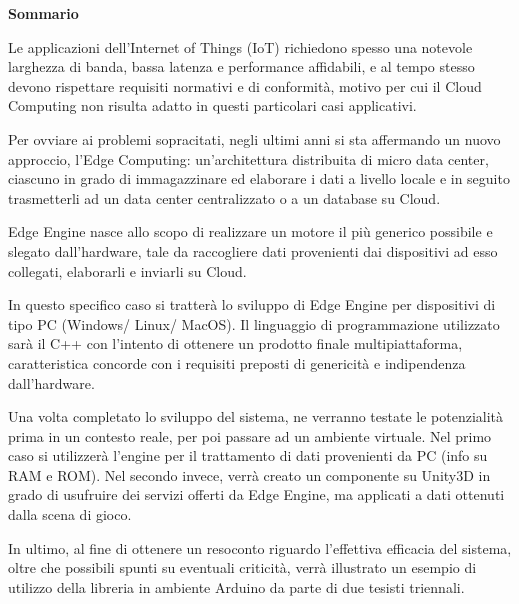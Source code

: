 \clearpage
\renewcommand{\headrulewidth}{0pt}
\begin{center}
	\huge{\textbf{Sommario}}
\end{center}
\null{}

\begin{spacing}{1.25}
	
Le applicazioni dell'Internet of Things (IoT) richiedono spesso una notevole larghezza di banda, bassa latenza e performance affidabili, e al tempo stesso devono rispettare requisiti normativi e di conformità, motivo per cui il Cloud Computing non risulta adatto in questi particolari casi applicativi.

Per ovviare ai problemi sopracitati, negli ultimi anni si sta affermando un nuovo approccio, l'Edge Computing: un’architettura distribuita di micro data center, ciascuno in grado di immagazzinare ed elaborare i dati a livello locale e in seguito trasmetterli ad un data center centralizzato o a un database su Cloud.

Edge Engine nasce allo scopo di realizzare un motore il più generico possibile e slegato dall'hardware, tale da raccogliere dati provenienti dai dispositivi ad esso collegati, elaborarli e inviarli su Cloud.

In questo specifico caso si tratterà lo sviluppo di Edge Engine per dispositivi di tipo PC (Windows/ Linux/ MacOS). Il linguaggio di programmazione utilizzato sarà il C++ con l'intento di ottenere un prodotto finale multipiattaforma, caratteristica concorde con i requisiti preposti di genericità e indipendenza dall'hardware.

Una volta completato lo sviluppo del sistema, ne verranno testate le potenzialità prima in un contesto reale, per poi passare ad un ambiente virtuale. Nel primo caso si utilizzerà l'engine per il trattamento di dati provenienti da PC (info su RAM e ROM). Nel secondo invece, verrà creato un componente su Unity3D in grado di usufruire dei servizi offerti da Edge Engine, ma applicati a dati ottenuti dalla scena di gioco.

In ultimo, al fine di ottenere un resoconto riguardo l'effettiva efficacia del sistema, oltre che possibili spunti su eventuali criticità, verrà illustrato un esempio di utilizzo della libreria in ambiente Arduino da parte di due tesisti triennali.
\end{spacing}
\null{}
\clearpage
\renewcommand{\headrulewidth}{0.5pt}

